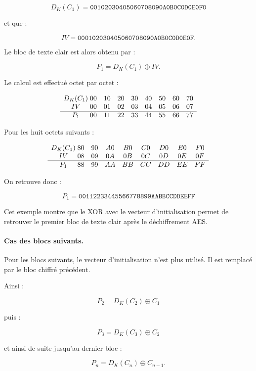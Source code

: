 \documentclass[12pt,a4paper]{article}
\begin{document}
\[
D_K(C_1)=
\texttt{00102030405060708090A0B0C0D0E0F0}
\]

et que :

\[
IV=
\texttt{000102030405060708090A0B0C0D0E0F}.
\]

Le bloc de texte clair est alors obtenu par :

\[
P_1=D_K(C_1)\oplus IV.
\]

Le calcul est effectué octet par octet :

\[
\begin{array}{c@{\;}cccccccc}
D_K(C_1)
&
00&10&20&30&40&50&60&70
\\
IV
&
00&01&02&03&04&05&06&07
\\
\hline
P_1
&
00&11&22&33&44&55&66&77
\end{array}
\]

Pour les huit octets suivants :

\[
\begin{array}{c@{\;}cccccccc}
D_K(C_1)
&
80&90&A0&B0&C0&D0&E0&F0
\\
IV
&
08&09&0A&0B&0C&0D&0E&0F
\\
\hline
P_1
&
88&99&AA&BB&CC&DD&EE&FF
\end{array}
\]

On retrouve donc :

\[
\boxed{
P_1=
\texttt{00112233445566778899AABBCCDDEEFF}
}
\]

Cet exemple montre que le XOR avec le vecteur d'initialisation
permet de retrouver le premier bloc de texte clair après le
déchiffrement AES.



\paragraph{Cas des blocs suivants.}

Pour les blocs suivants, le vecteur d'initialisation n'est plus
utilisé. Il est remplacé par le bloc chiffré précédent.

Ainsi :

\[
\boxed{
P_2=D_K(C_2)\oplus C_1
}
\]

puis :

\[
\boxed{
P_3=D_K(C_3)\oplus C_2
}
\]

et ainsi de suite jusqu'au dernier bloc :

\[
\boxed{
P_n=D_K(C_n)\oplus C_{n-1}.
}
\]
\end{document}
